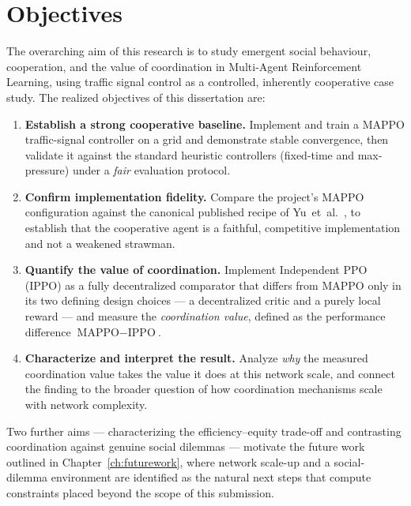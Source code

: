 \chapter{Objectives}
\label{ch:objectives}

The overarching aim of this research is to study emergent social behaviour,
cooperation, and the value of coordination in Multi-Agent Reinforcement Learning,
using traffic signal control as a controlled, inherently cooperative case study.
The realized objectives of this dissertation are:

\begin{enumerate}[leftmargin=1.6em]
  \item \textbf{Establish a strong cooperative baseline.} Implement and train a
  MAPPO traffic-signal controller on a  grid and demonstrate stable
  convergence, then validate it against the standard heuristic controllers
  (fixed-time and max-pressure) under a \emph{fair} evaluation protocol.

  \item \textbf{Confirm implementation fidelity.} Compare the project's MAPPO
  configuration against the canonical published recipe of
  Yu~et~al.~\cite{yu2021mappo}, to establish that the cooperative agent is a faithful,
  competitive implementation and not a weakened strawman.

  \item \textbf{Quantify the value of coordination.} Implement Independent PPO
  (IPPO) as a fully decentralized comparator that differs from MAPPO only in its
  two defining design choices --- a decentralized critic and a purely local reward
  --- and measure the \emph{coordination value}, defined as the performance
  difference $\text{MAPPO} - \text{IPPO}$.

  \item \textbf{Characterize and interpret the result.} Analyze \emph{why} the
  measured coordination value takes the value it does at this network scale, and
  connect the finding to the broader question of how coordination mechanisms scale
  with network complexity.
\end{enumerate}

Two further aims --- characterizing the efficiency--equity trade-off and contrasting
coordination against genuine social dilemmas --- motivate the future work outlined in
Chapter~\ref{ch:futurework}, where network scale-up and a social-dilemma
environment are identified as the natural next steps that compute constraints
placed beyond the scope of this submission.
